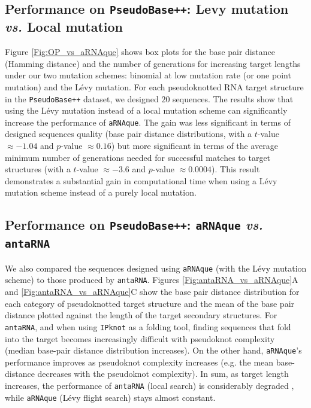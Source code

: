 \subsection*{Performance on \texttt{PseudoBase++}: Levy mutation \emph{vs.} Local mutation}
Figure \ref{Fig:OP_vs_aRNAque} shows box plots for the base pair distance (Hamming distance) and the number of generations for increasing target lengths under our two mutation schemes: binomial at low mutation rate (or one point mutation) and the Lévy mutation. For each pseudoknotted RNA target structure in the \texttt{PseudoBase++} dataset, we designed $20$ sequences.  The results show that using the Lévy mutation instead of a local mutation scheme can significantly increase the performance of \texttt{aRNAque}.  The gain was less significant in terms of designed sequences quality  (base pair distance distributions, with a $t$-value $\approx -1.04$ and $p$-value $\approx 0.16$) but more significant in terms of the average minimum number of generations needed for successful matches to target structures (with a $t$-value $\approx -3.6$ and $p$-value $\approx 0.0004$). This result demonstrates a substantial gain in computational time when using a Lévy mutation scheme instead of a purely local mutation.

\subsection*{Performance on \texttt{PseudoBase++}: \texttt{aRNAque} \emph{vs.} \texttt{antaRNA}}

We also compared the sequences designed using \texttt{aRNAque} (with the Lévy mutation scheme) to those produced by \texttt{antaRNA}. Figures \ref{Fig:antaRNA_vs_aRNAque}A and \ref{Fig:antaRNA_vs_aRNAque}C show the base pair distance distribution for each category of pseudoknotted target structure and the mean of the base pair distance plotted against the length of the target secondary structures. For \texttt{antaRNA}, and when using \texttt{IPknot} as a folding tool, finding sequences that fold into the target becomes increasingly difficult with pseudoknot complexity (median base-pair distance distribution increases). On the other hand, \texttt{aRNAque}’s performance improves as pseudoknot complexity increases (e.g. the mean base-distance decreases with the pseudoknot complexity). In sum, as target length increases, the performance of \texttt{antaRNA} (local search) is considerably degraded , while \texttt{aRNAque} (Lévy flight search) stays almost constant.


